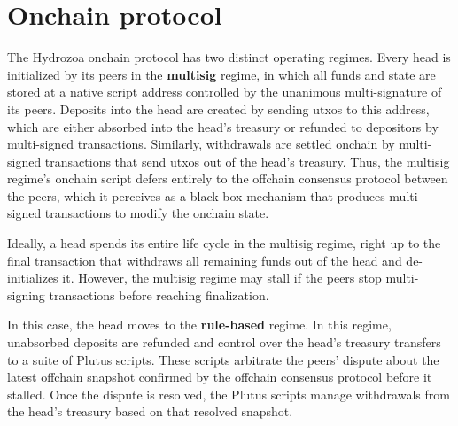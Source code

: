 \documentclass[../hydrozoa.tex]{subfiles}
\begin{document}
\chapter{Onchain protocol}%
\label{h:onchain-protocol}

The Hydrozoa onchain protocol has two distinct operating regimes.
Every head is initialized by its peers in the \textbf{multisig} regime, in which all funds and state are stored at a native script address controlled by the unanimous multi-signature of its peers.
Deposits into the head are created by sending utxos to this address, which are either absorbed into the head's treasury or refunded to depositors by multi-signed transactions.
Similarly, withdrawals are settled onchain by multi-signed transactions that send utxos out of the head's treasury.
Thus, the multisig regime's onchain script defers entirely to the offchain consensus protocol between the peers, which it perceives as a black box mechanism that produces multi-signed transactions to modify the onchain state.

Ideally, a head spends its entire life cycle in the multisig regime, right up to the final transaction that withdraws all remaining funds out of the head and de-initializes it.
However, the multisig regime may stall if the peers stop multi-signing transactions before reaching finalization.

In this case, the head moves to the \textbf{rule-based} regime.
In this regime, unabsorbed deposits are refunded and control over the head's treasury transfers to a suite of Plutus scripts. 
These scripts arbitrate the peers' dispute about the latest offchain snapshot confirmed by the offchain consensus protocol before it stalled.
Once the dispute is resolved, the Plutus scripts manage withdrawals from the head's treasury based on that resolved snapshot.
\end{document}
